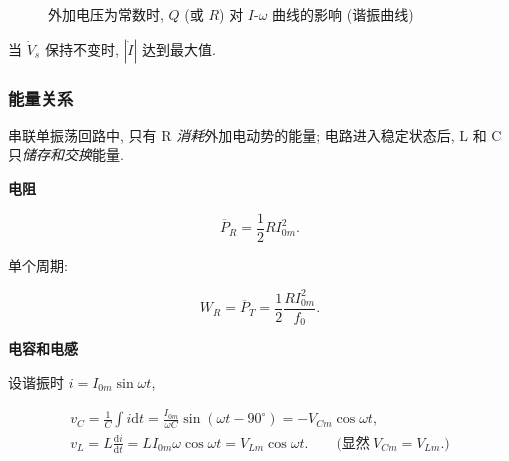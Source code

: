 \documentclass{notes}
\begin{document}
\begin{figure}[H]
    \centering
    \caption{外加电压为常数时, $Q$ (或 $R$) 对 $I$-$\omega$ 曲线的影响 (谐振曲线)}
\end{figure}

当 $\dot{V}_s$ 保持不变时, $|\dot{I}|$ 达到最大值.

\subsubsection{能量关系} \label{能量关系}

串联单振荡回路中, 只有 R \textit{消耗}外加电动势的能量; 电路进入稳定状态后, L 和 C 只\textit{储存和交换}能量.

\textbf{电阻}

\begin{equation}
    \overline{P}_R=\frac{1}{2}RI_{0m}^2.
\end{equation}

单个周期:

\begin{equation}
    W_R=\overline{P}_T=\frac{1}{2}\frac{RI_{0m}^2}{f_0}.
\end{equation}

\textbf{电容和电感}

设谐振时 $i=I_{0m}\sin\omega t$,

\begin{equation*}
    \begin{gathered}
        v_C=\frac{1}{C}\int i\mathrm{d}t=\frac{I_{0m}}{\omega C}\sin(\omega t-90^\circ)=-V_{Cm}\cos\omega t, \\
        v_L=L\frac{\mathrm{d}i}{\mathrm{d}t}=LI_{0m}\omega\cos\omega t=V_{Lm}\cos\omega t.\qquad\textrm{(显然}\ V_{Cm}=V_{Lm}\textrm{.)}
    \end{gathered}
\end{equation*}
\end{document}
